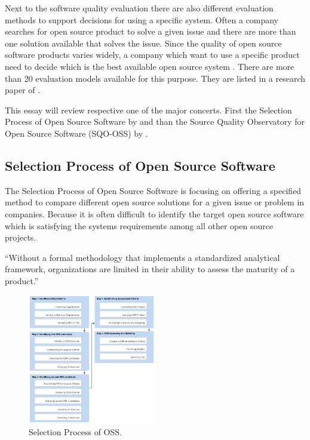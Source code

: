 \documentclass[DIV=calc,paper=a4,fontsize=9pt,twocolumn]{scrartcl}
\begin{document}
Next to the software quality evaluation there are also different evaluation methods to support decisions for using a specific system. Often a company searches for open source product to solve a given issue and there are more than one solution available that solves the issue. Since the quality of open source software products varies widely, a company which want to use a specific product need to decide which is the best available open source system \citep{stol2010comparison}. There are more than 20 evaluation models available for this purpose. They are listed in a research paper of \citet{stol2010comparison}.

This essay will review respective one of the major concerts. First the Selection Process of Open Source Software by \citet{lee2007study} and than the Source Quality Observatory for Open Source Software (SQO-OSS) by \citet{samoladas2008sqo}.

\subsection{Selection Process of Open Source Software}

The Selection Process of Open Source Software is focusing on offering a specified method to compare different open source solutions for a given issue or problem in companies. Because it is often difficult to identify the target open source software which is satisfying the systems requirements among all other open source projects. \citep{lee2007study}

\enquote{Without a formal methodology that implements a standardized analytical framework, organizations are limited in their ability to assess the maturity of a product.} \citep{golden08}

\begin{figure}[ht]
    \includegraphics[width=0.5\textwidth ]{img/selectionprocess.png}{}
    \centering
    \caption{Selection Process of OSS. \citet{lee2007study}}\label{fig:selection-process.png}
\end{figure}
\end{document}
